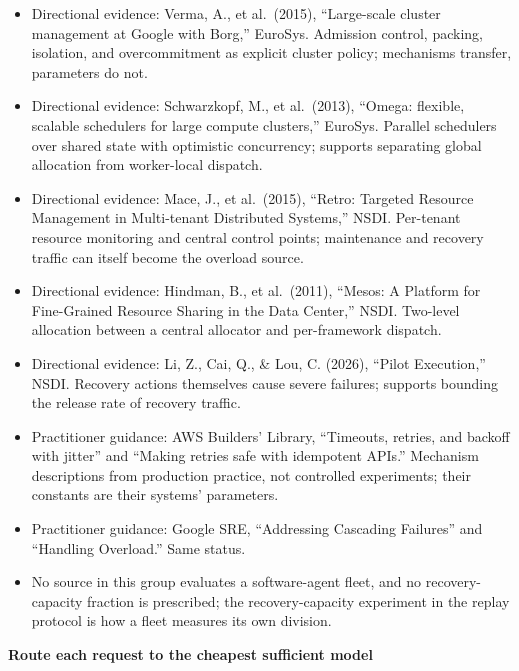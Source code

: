 \begin{itemize}
\tightlist
\item
  Directional evidence: Verma, A., et al.~(2015), ``Large-scale cluster management at Google with Borg,'' EuroSys. Admission control, packing, isolation, and overcommitment as explicit cluster policy; mechanisms transfer, parameters do not.
\item
  Directional evidence: Schwarzkopf, M., et al.~(2013), ``Omega: flexible, scalable schedulers for large compute clusters,'' EuroSys. Parallel schedulers over shared state with optimistic concurrency; supports separating global allocation from worker-local dispatch.
\item
  Directional evidence: Mace, J., et al.~(2015), ``Retro: Targeted Resource Management in Multi-tenant Distributed Systems,'' NSDI. Per-tenant resource monitoring and central control points; maintenance and recovery traffic can itself become the overload source.
\item
  Directional evidence: Hindman, B., et al.~(2011), ``Mesos: A Platform for Fine-Grained Resource Sharing in the Data Center,'' NSDI. Two-level allocation between a central allocator and per-framework dispatch.
\item
  Directional evidence: Li, Z., Cai, Q., \& Lou, C. (2026), ``Pilot Execution,'' NSDI. Recovery actions themselves cause severe failures; supports bounding the release rate of recovery traffic.
\item
  Practitioner guidance: AWS Builders' Library, ``Timeouts, retries, and backoff with jitter'' and ``Making retries safe with idempotent APIs.'' Mechanism descriptions from production practice, not controlled experiments; their constants are their systems' parameters.
\item
  Practitioner guidance: Google SRE, ``Addressing Cascading Failures'' and ``Handling Overload.'' Same status.
\item
  No source in this group evaluates a software-agent fleet, and no recovery-capacity fraction is prescribed; the recovery-capacity experiment in the replay protocol is how a fleet measures its own division.
\end{itemize}

\textbf{Route each request to the cheapest sufficient model}

